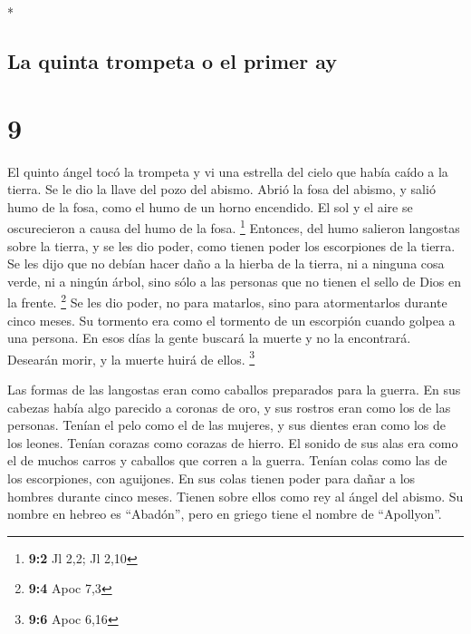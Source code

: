 \begin{paracol}{2}
\begin{otherlanguage}{english}
\end{otherlanguage}

\switchcolumn[0]*

\hypertarget{la-quinta-trompeta-o-el-primer-ay}{%
\subsection{La quinta trompeta o el primer
ay}\label{la-quinta-trompeta-o-el-primer-ay}}

\hypertarget{section-16}{%
\section{9}\label{section-16}}

 El quinto ángel tocó la trompeta y vi una estrella del
cielo que había caído a la tierra. Se le dio la llave del pozo del
abismo.  Abrió la fosa del abismo, y salió humo de la
fosa, como el humo de un horno encendido. El sol y el aire se
oscurecieron a causa del humo de la fosa. \footnote{\textbf{9:2} Jl 2,2;
  Jl 2,10}  Entonces, del humo salieron langostas sobre la
tierra, y se les dio poder, como tienen poder los escorpiones de la
tierra.  Se les dijo que no debían hacer daño a la hierba
de la tierra, ni a ninguna cosa verde, ni a ningún árbol, sino sólo a
las personas que no tienen el sello de Dios en la frente. \footnote{\textbf{9:4}
  Apoc 7,3}  Se les dio poder, no para matarlos, sino para
atormentarlos durante cinco meses. Su tormento era como el tormento de
un escorpión cuando golpea a una persona.  En esos días la
gente buscará la muerte y no la encontrará. Desearán morir, y la muerte
huirá de ellos. \footnote{\textbf{9:6} Apoc 6,16}

 Las formas de las langostas eran como caballos preparados
para la guerra. En sus cabezas había algo parecido a coronas de oro, y
sus rostros eran como los de las personas.  Tenían el pelo
como el de las mujeres, y sus dientes eran como los de los leones.
 Tenían corazas como corazas de hierro. El sonido de sus
alas era como el de muchos carros y caballos que corren a la guerra.
 Tenían colas como las de los escorpiones, con aguijones.
En sus colas tienen poder para dañar a los hombres durante cinco meses.
 Tienen sobre ellos como rey al ángel del abismo. Su
nombre en hebreo es ``Abadón'', pero en griego tiene el nombre de
``Apollyon''.


\end{paracol}
